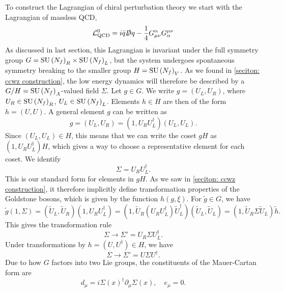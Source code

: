 To construct the Lagrangian of chiral perturbation theory we start with the Lagrangian of massless QCD, 
%
\begin{equation}
    \mathcal{L}^0_\text{QCD} = i \bar q \slashed D q - \frac{1}{4} G^\alpha_{\mu \nu} G_\alpha^{\mu \nu}
\end{equation}
%
As discussed in last section, this Lagrangian is invariant under the full symmetry group $G = \text{SU}\left(N_f\right)_R \times \text{SU}\left(N_f\right)_L$, but the system undergoes spontaneous symmetry breaking to the smaller group $H = \text{SU}\left(N_f\right)_V$.
As we found in \autoref{seciton: ccwz construction}, the low energy dynamics will therefore be described by a $G/H = \text{SU}\left(N_f\right)_A$-valued field $\Sigma$.
Let $g \in G$.
We write $g = (U_L, U_R)$, where $U_R \in \text{SU}\left(N_f\right)_R$, $U_L \in \text{SU}\left(N_f\right)_L$.
Elements $h \in H$ are then of the form $h = (U, U)$.
A general element $g$ can be written as
%
\begin{equation}
    g = (U_L, U_R) = (1, U_R U_L^\dagger) (U_L, U_L).
\end{equation}
%
Since $(U_L, U_L) \in H$, this means that we can write the coset $g H$ as $(1, U_R U_L^\dagger)H$, which gives a way to choose a representative element for each coset.
We identify
%
\begin{equation}
    \Sigma = U_R U_L^\dagger. 
\end{equation}
%
This is our standard form for elements in $gH$.
As we saw in \autoref{seciton: ccwz construction}, it therefore implicitly define transformation properties of the Goldstone bosons, which is given by the function $h(g, \xi)$.
For $\tilde g \in G$, we have
%
\begin{equation}
    \tilde g (1, \Sigma)
    = (\tilde U_L, \tilde U_R) (1, U_R U_L^\dagger)
    = (1, \tilde U_R (U_R U_L^\dagger) \tilde U_L^\dagger) (\tilde U_L, \tilde U_L)
    = (1, \tilde U_R \Sigma \tilde U_L) \tilde h.
\end{equation}
%
This gives the transformation rule
\begin{equation}
    \Sigma \rightarrow \Sigma' = U_R \Sigma U_L^\dagger.
\end{equation}
%
Under transformations by $h = (U, U^\dagger) \in H$, we have
\begin{equation}
    \label{sigma transform under H}
    \Sigma \rightarrow \Sigma' = U \Sigma U^\dagger.
\end{equation}
%
Due to how $G$ factors into two Lie groups, the constituents of the Mauer-Cartan form are 
%
\begin{equation}
    d_\mu = i \Sigma(x)^\dagger \partial_\mu \Sigma(x),\quad
    e_\mu = 0.
\end{equation}
